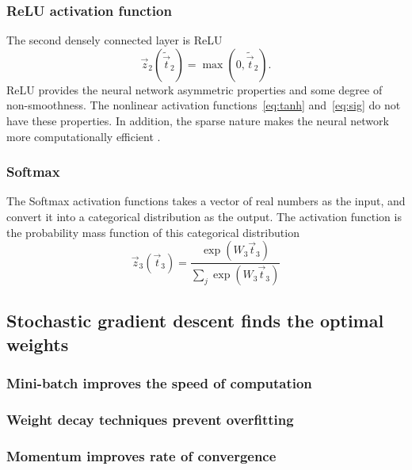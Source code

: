 \subsubsection{ReLU activation function}
The second densely connected layer is ReLU
\begin{equation*}
   \vec z_2(\tilde{\vec  t}_2)=\max(0,\tilde{\vec  t}_2).
\end{equation*} 
ReLU provides the neural network asymmetric properties and some degree of non-smoothness. The nonlinear activation functions~\eqref{eq:tanh}  and~\eqref{eq:sig} do not have these properties. 
In addition, the sparse nature makes the neural network more computationally efficient \citep{NIPS20145267}.
\subsubsection{Softmax}
The Softmax activation functions takes a vector of real numbers as the input, and convert it into a categorical distribution as the output. The activation function is the probability mass function of this categorical distribution
\begin{equation}
     \vec z_{3}(\vec t_3)=\frac{\exp(W_3 \vec t_{3})}{\sum _{j}\exp{(W_3 \vec t_{3})}}
\end{equation}
\subsection{Stochastic gradient descent finds the optimal weights}
\subsubsection{Mini-batch improves the speed of computation}
\subsubsection{Weight decay techniques prevent overfitting}
\subsubsection{Momentum improves rate of convergence}

